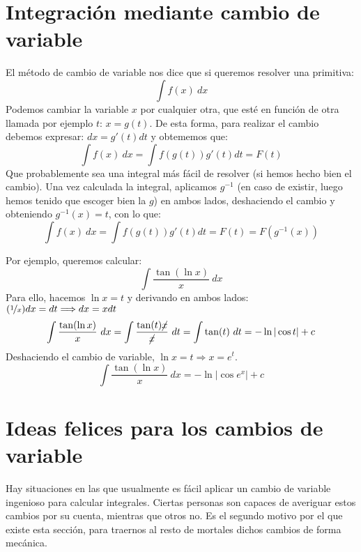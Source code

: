\section{Integración mediante cambio de variable}
El método de cambio de variable nos dice que si queremos resolver una primitiva:
\begin{equation*}
    \displaystyle\int f(x)~dx  
\end{equation*}
Podemos cambiar la variable $x$ por cualquier otra, que esté en función de otra llamada por ejemplo $t$: $x = g(t)$. De esta forma, para realizar el cambio debemos expresar: $dx = g'(t)dt$ y obtememos que:
\begin{equation*}
    \displaystyle\int f(x)~dx  = \displaystyle\int f(g(t))g'(t)dt = F(t)
\end{equation*}
Que probablemente sea una integral más fácil de resolver (si hemos hecho bien el cambio). Una vez calculada la integral, aplicamos $g^{-1}$ (en caso de existir, luego hemos tenido que escoger bien la $g$) en ambos lados, deshaciendo el cambio y obteniendo $g^{-1}(x) = t$, con lo que:
\begin{equation*}
    \displaystyle\int f(x)~dx  = \displaystyle\int f(g(t))g'(t)dt = F(t) = F(g^{-1}(x))
\end{equation*}

\begin{ejemplo}
    Por ejemplo, queremos calcular:
    \begin{equation*}
        \displaystyle\int \dfrac{\tan(\ln x)}{x}~dx 
    \end{equation*}
    Para ello, hacemos $\ln x = t$ y derivando en ambos lados: $(\nicefrac{1}{x})dx = dt \Longrightarrow dx = xdt$
    \begin{equation*}
        \displaystyle\int \dfrac{\tan(\ln x)}{x}~dx = \displaystyle\int \dfrac{\tan(t)\cancel{x}}{\cancel{x}}~dt = \displaystyle\int \tan(t)~dt = -\ln |\cos t| + c
    \end{equation*}
    Deshaciendo el cambio de variable, $\ln x = t \Longrightarrow x = e^t$.
    \begin{equation*}
        \displaystyle\int \dfrac{\tan(\ln x)}{x}~dx = -\ln |\cos e^x| + c
    \end{equation*}
\end{ejemplo}

\section{Ideas felices para los cambios de variable}
Hay situaciones en las que usualmente es fácil aplicar un cambio de variable ingenioso para calcular integrales. Ciertas personas son capaces de averiguar estos cambios por su cuenta, mientras que otros no. Es el segundo motivo por el que existe esta sección, para traernos al resto de mortales dichos cambios de forma mecánica.

